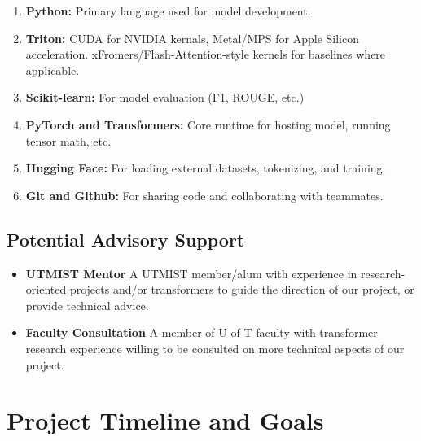 \documentclass{article}
\begin{document}
\begin{enumerate}
    \item \textbf{Python:} Primary language used for model development.
    \item \textbf{Triton:} CUDA for NVIDIA kernals, Metal/MPS for Apple Silicon acceleration. xFromers/Flash-Attention-style kernels for baselines where applicable.
    \item \textbf{Scikit-learn:} For model evaluation (F1, ROUGE, etc.)
    \item \textbf{PyTorch and Transformers:} Core runtime for hosting model, running tensor math, etc.
    \item \textbf{Hugging Face:} For loading external datasets, tokenizing, and training.
    \item \textbf{Git and Github:} For sharing code and collaborating with teammates.
\end{enumerate}

\subsection{Potential Advisory Support}
\begin{itemize}
    \item \textbf{UTMIST Mentor} A UTMIST member/alum with experience in research-oriented projects and/or transformers to guide the direction of our project, or provide technical advice.
    \item \textbf{Faculty Consultation} A member of U of T faculty with transformer research experience willing to be consulted on more technical aspects of our project.
\end{itemize}


\section{Project Timeline and Goals}
\end{document}
